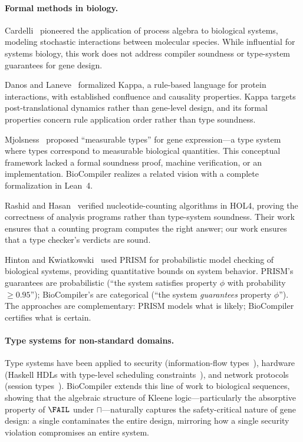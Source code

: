 \paragraph{Formal methods in biology.}
Cardelli~\cite{cardelli2008process} pioneered the application of process
algebra to biological systems, modeling stochastic interactions between
molecular species.  While influential for systems biology, this work does
not address compiler soundness or type-system guarantees for gene design.

Danos and Laneve~\cite{danos2004formal} formalized Kappa, a rule-based
language for protein interactions, with established confluence and
causality properties.  Kappa targets post-translational dynamics rather
than gene-level design, and its formal properties concern rule
application order rather than type soundness.

Mjolsness~\cite{mjolsness2010measurable} proposed ``measurable types''
for gene expression---a type system where types correspond to measurable
biological quantities.  This conceptual framework lacked a formal
soundness proof, machine verification, or an implementation.  BioCompiler
realizes a related vision with a complete formalization in Lean~4.

Rashid and Hasan~\cite{rashid2017hol4} verified nucleotide-counting
algorithms in HOL4, proving the correctness of analysis programs rather
than type-system soundness.  Their work ensures that a counting program
computes the right answer; our work ensures that a type checker's
verdicts are sound.

Hinton and Kwiatkowski~\cite{hinton2006prism} used PRISM for
probabilistic model checking of biological systems, providing
quantitative bounds on system behavior.  PRISM's guarantees are
probabilistic (``the system satisfies property $\phi$ with probability
$\ge 0.95$''); BioCompiler's are categorical (``the system
\emph{guarantees} property $\phi$'').  The approaches are complementary:
PRISM models what is likely; BioCompiler certifies what is certain.

\paragraph{Type systems for non-standard domains.}
Type systems have been applied to security (information-flow
types~\cite{abadi2000security}), hardware (Haskell HDLs with
type-level scheduling constraints~\cite{hanna2010hardware}), and network
protocols (session types~\cite{mandel2005bidirectional}).  BioCompiler
extends this line of work to biological sequences, showing that the
algebraic structure of Kleene logic---particularly the absorptive
property of $\FAIL$ under $\sqcap$---naturally captures the
safety-critical nature of gene design: a single \FAIL{} contaminates the
entire design, mirroring how a single security violation compromises an
entire system.


